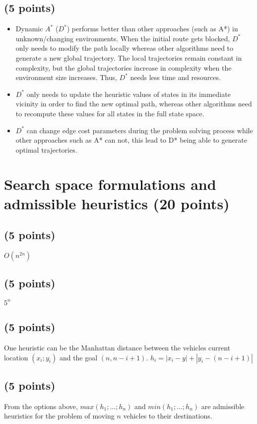 \documentclass[12pt]{article}
\begin{document}
\subsection{(5 points)}
\begin{itemize}

\item Dynamic $A^*$ ($D^*$) performs better than other approaches (such as A*) in unknown/changing environments. When the initial route gets blocked, $D^*$ only needs to modify the path locally whereas other algorithms need to generate a new global trajectory. The local trajectories remain constant in complexity, but the global trajectories increase in complexity when the environment size increases. Thus, $D^*$ needs less time and resources.
\item $D^*$ only needs to update the heuristic values of states in its immediate vicinity in order to find the new optimal path, whereas other algorithms need to recompute these values for all states in the full state space. 
\item $D^*$ can change edge cost parameters during the problem solving process while other approaches such as A* can not, this lead to D* being able to generate optimal trajectories. 
\end{itemize}

\section{Search space formulations and admissible heuristics (20 points)}
\subsection{(5 points)}
$O(n^{2n})$

\subsection{(5 points)}
$5^n$

\subsection{(5 points)}
One heuristic can be the Manhattan distance between the vehicles current location $(x_i;y_i)$ and the goal $(n ,n - i + 1 )$. 
$h_i = |x_i  -y| + |y_i -(n-i+1)|$

\subsection{(5 points)}
From the options above, $max(h_1;...;h_n)$ and $min(h_1;...;h_n)$ are admissible heuristics for the problem of moving $n$ vehicles to their destinations. 
\end{document}
